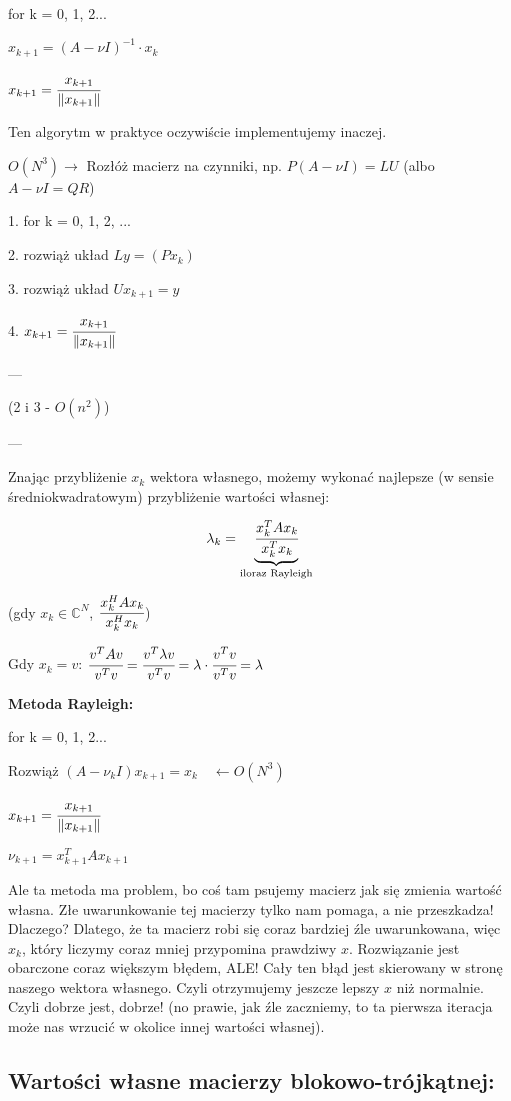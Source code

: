 \documentclass[hidelinks,a4paper]{article}
\newcommand{\CC}{\mathbb{C}}
\newcommand{\ra}{\rightarrow}
\newcommand{\la}{\leftarrow}
\newcommand{\norm}[1]{\left\lVert#1\right\rVert}
\begin{document}
for k = 0, 1, 2...
 
$x_{k+1} = (A - \nu I)^{-1}\cdot x_k$
 
$x_{k+1} = \cfrac{x_{k+1}}{\norm{x_{k+1}}}$


Ten algorytm w praktyce oczywiście implementujemy inaczej.

$O(N^3) \ra $ Rozłóż macierz na czynniki, np. $P(A-\nu I) = LU$ (albo $A - \nu I = QR$)

1. for k = 0, 1, 2, ... 

2. rozwiąż układ $Ly = (Px_k)$

3. rozwiąż układ $U x_{k+1} = y$

4. $x_{k+1} = \cfrac{x_{k+1}}{\norm{x_{k+1}}}$

---

(2 i 3 - $O(n^2)$)

---

Znając przybliżenie $x_k$ wektora własnego, możemy wykonać najlepsze (w sensie średniokwadratowym) przybliżenie wartości własnej:

\[
	\lambda_k = \underbrace{\cfrac{x^T_k A x_k}{x_k^T x_k}}_{\textrm{iloraz Rayleigh}}
\]

(gdy $x_k \in \CC^N$, $\cfrac{x_k^H A x_k}{x_k^Hx_k}$)

Gdy $x_k = v$: $\cfrac{v^TAv}{v^Tv} = \cfrac{v^T \lambda v}{v^T v} = \lambda \cdot \cfrac{v^T v}{v^T v} = \lambda$


\textbf{Metoda Rayleigh:}

for k = 0, 1, 2...

Rozwiąż $(A - \nu_k I)x_{k+1} = x_k \quad \la O(N^3)$
 
$x_{k+1} = \cfrac{x_{k+1}}{\norm{x_{k+1}}}$

$\nu_{k+1} = x_{k+1}^T A x_{k+1}$
 
Ale ta metoda ma problem, bo coś tam psujemy macierz jak się zmienia wartość własna. Złe uwarunkowanie tej macierzy tylko nam pomaga, a nie przeszkadza! Dlaczego? Dlatego, że ta macierz robi się coraz bardziej źle uwarunkowana, więc $x_k$, który liczymy coraz mniej przypomina prawdziwy $x$. Rozwiązanie jest obarczone coraz większym błędem, ALE! Cały ten błąd jest skierowany w stronę naszego wektora własnego. Czyli otrzymujemy jeszcze lepszy $x$ niż normalnie. Czyli dobrze jest, dobrze! (no prawie, jak źle zaczniemy, to ta pierwsza iteracja może nas wrzucić w okolice innej wartości własnej). 


\subsection{Wartości własne macierzy blokowo-trójkątnej:}
\end{document}
